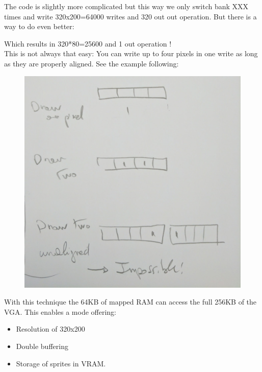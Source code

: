 \documentclass[book.tex]{subfiles}
\begin{document}
The code is slightly more complicated but this way we only switch bank XXX times and write 320x200=64000 writes and  320 out out operation. But there is a way to do even better:\\
\par
\begin{minipage}{\textwidth}

\end{minipage}

Which results in 320*80=25600 and 1 out operation !\\

This is not always that easy: You can write up to four pixels in one write as long as they are properly aligned. See the example following:
\begin{figure}[H]
  \centering
 \includegraphics[width=\textwidth]{imgs//vga_multiple_pixel_write.png}
\end{figure}


\par
With this technique the 64KB of mapped RAM can access the full 256KB of the VGA. This enables a mode offering:
\begin{itemize}
  \item Resolution of 320x200
  \item Double buffering
  \item Storage of sprites in VRAM.
\end{itemize}
\end{document}
